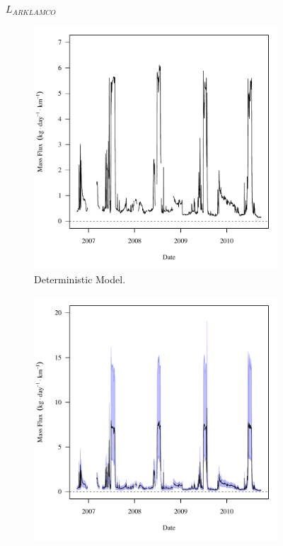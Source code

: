 \begin{linenumbers}
\subfiguretop
\begin{landscape}
	\begin{figure}
		$ \displaystyle L_{ARKLAMCO} $
		\begin{subfigure}{0.7\textwidth}
			\centering
			\includegraphics[width=\tableCustomSize]{"Figures/Results_DSR/Deterministic/f D101C"}
			\caption{Deterministic Model.}
		\end{subfigure}%
		\begin{subfigure}{0.7\textwidth}
			\centering
			\includegraphics[width=\tableCustomSize]{"Figures/Results_DSR/Stochastic/f D101C"}

\end{subfigure}
\end{figure}
\end{landscape}
\end{linenumbers}
